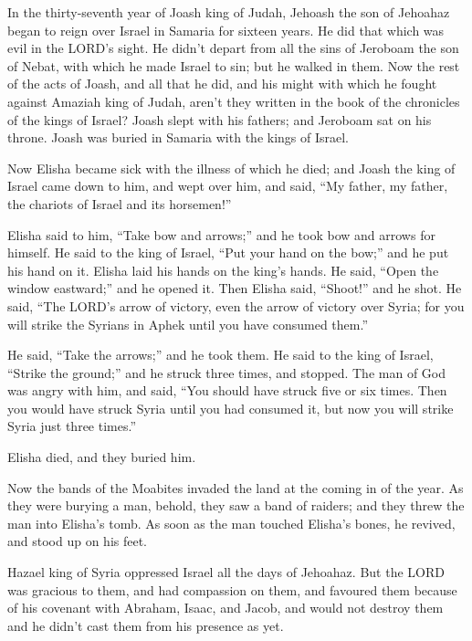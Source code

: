  In the thirty-seventh year of Joash king of Judah, Jehoash
the son of Jehoahaz began to reign over Israel in Samaria for sixteen
years.  He did that which was evil in the LORD's sight. He
didn't depart from all the sins of Jeroboam the son of Nebat, with which
he made Israel to sin; but he walked in them.  Now the rest
of the acts of Joash, and all that he did, and his might with which he
fought against Amaziah king of Judah, aren't they written in the book of
the chronicles of the kings of Israel?  Joash slept with
his fathers; and Jeroboam sat on his throne. Joash was buried in Samaria
with the kings of Israel.

 Now Elisha became sick with the illness of which he died;
and Joash the king of Israel came down to him, and wept over him, and
said, ``My father, my father, the chariots of Israel and its horsemen!''

 Elisha said to him, ``Take bow and arrows;'' and he took
bow and arrows for himself.  He said to the king of Israel,
``Put your hand on the bow;'' and he put his hand on it. Elisha laid his
hands on the king's hands.  He said, ``Open the window
eastward;'' and he opened it. Then Elisha said, ``Shoot!'' and he shot.
He said, ``The LORD's arrow of victory, even the arrow of victory over
Syria; for you will strike the Syrians in Aphek until you have consumed
them.''

 He said, ``Take the arrows;'' and he took them. He said to
the king of Israel, ``Strike the ground;'' and he struck three times,
and stopped.  The man of God was angry with him, and said,
``You should have struck five or six times. Then you would have struck
Syria until you had consumed it, but now you will strike Syria just
three times.''

 Elisha died, and they buried him.

Now the bands of the Moabites invaded the land at the coming in of the
year.  As they were burying a man, behold, they saw a band
of raiders; and they threw the man into Elisha's tomb. As soon as the
man touched Elisha's bones, he revived, and stood up on his feet.

 Hazael king of Syria oppressed Israel all the days of
Jehoahaz.  But the LORD was gracious to them, and had
compassion on them, and favoured them because of his covenant with
Abraham, Isaac, and Jacob, and would not destroy them and he didn't cast
them from his presence as yet.

